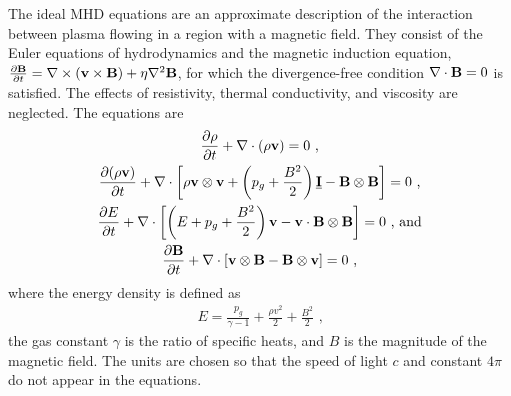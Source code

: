 The ideal MHD equations are an approximate description of the interaction between plasma flowing in a region with a magnetic field.  They consist of the Euler equations of hydrodynamics and the magnetic induction equation, $\frac{\partial \mathbf{B}}{\partial t} = \mathbf{\nabla} \times \left( \mathbf{v} \times \mathbf{B}\right) + \eta\mathbf{\nabla}^2\mathbf{B}$, for which the divergence-free condition $\mathbf{\nabla} \cdot \mathbf{B} = 0$ is satisfied.  The effects of resistivity, thermal conductivity, and viscosity are neglected.  The equations are
\begin{gather}
\label{eqn:mhd1} \frac{\partial \rho}{\partial t} + \mathbf{\nabla} \cdot \left(\rho\mathbf{v}\right) = 0 \text{ ,} \\
\label{eqn:mhd2} \frac{\partial (\rho \mathbf{v})}{\partial t} + \mathbf{\nabla} \cdot \left[ \rho\mathbf{v} \otimes \mathbf{v} + \left( p_g + \frac{B^2}{2}\right)\underline{\mathbf{I}} - \mathbf{B} \otimes \mathbf{B}\right]  = 0 \text{ ,}\\
\label{eqn:mhd3} \frac{\partial E}{\partial t} + \mathbf{\nabla} \cdot \left[ \left(E + p_g + \frac{B^2}{2}\right)\mathbf{v} - \mathbf{v} \cdot \mathbf{B} \otimes \mathbf{B}\right]  = 0 \text{ , and} \\
\label{eqn:mhd4} \frac{\partial \mathbf{B}}{\partial t} + \mathbf{\nabla} \cdot \left[ \mathbf{v} \otimes \mathbf{B} - \mathbf{B} \otimes \mathbf{v}\right]  = 0 \text{ ,}
\end{gather}
where the energy density is defined as
\begin{gather}
  \label{eqn:energy} E = \frac{p_g}{\gamma - 1} + \frac{\rho v^2}{2} + \frac{B^2}{2}\text{ ,}
\end{gather}
the gas constant $\gamma$ is the ratio of specific heats, and $B$ is the magnitude of the magnetic field.  The units are chosen so that the speed of light $c$ and constant $4\pi$ do not appear in the equations.    

